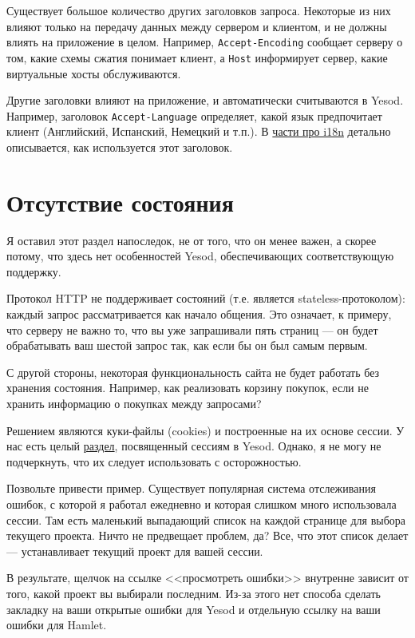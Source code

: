 Существует большое количество других заголовков запроса. Некоторые из них влияют только на
передачу данных между сервером и клиентом, и не должны влиять на приложение в целом.
Например, \verb*|Accept-Encoding| сообщает серверу о том, какие схемы сжатия понимает
клиент, а \verb*|Host| информирует сервер, какие виртуальные хосты обслуживаются.

Другие заголовки влияют на приложение, и автоматически считываются в Yesod. Например,
заголовок \verb*|Accept-Language| определяет, какой язык предпочитает клиент (Английский,
Испанский, Немецкий и т.п.). В
\hyperref[chap:i18n]{части про i18n} детально описывается, как используется этот
заголовок.

\section{Отсутствие состояния}

Я оставил этот раздел напоследок, не от того, что он менее важен, а скорее потому, что
здесь нет особенностей Yesod, обеспечивающих соответствующую поддержку.

Протокол HTTP не поддерживает состояний (т.е. является stateless-протоколом): каждый
запрос рассматривается
как начало общения. Это означает, к примеру, что серверу не важно то, что вы уже
запрашивали пять страниц --- он будет обрабатывать ваш шестой запрос так, как если бы он
был самым первым.

С другой стороны, некоторая функциональность сайта не будет работать без хранения состояния. Например, как реализовать корзину покупок, если не хранить информацию о покупках между запросами?

Решением являются куки-файлы (cookies) и построенные на их основе сессии. У нас есть
целый
\hyperref[chap:sessions]{раздел}, посвященный сессиям в Yesod. Однако, я не могу не
подчеркнуть, что их следует использовать с осторожностью.

Позвольте привести пример. Существует популярная система отслеживания ошибок, с которой я
работал ежедневно и которая слишком много использовала сессии. Там есть маленький
выпадающий список на каждой странице для выбора текущего проекта. Ничто не предвещает
проблем, да? Все, что этот список делает --- устанавливает текущий проект для вашей
сессии.

В результате, щелчок на ссылке <<просмотреть ошибки>> внутренне зависит от того, какой
проект вы выбирали последним. Из-за этого нет способа сделать закладку на ваши открытые
ошибки для Yesod и отдельную ссылку на ваши ошибки для Hamlet.

